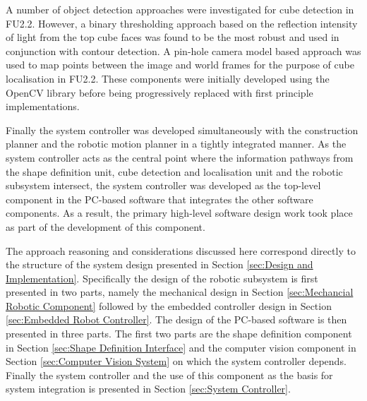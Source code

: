 A number of object detection approaches were investigated for cube detection in FU2.2. However, a binary thresholding approach based on the reflection intensity of light from the top cube faces was found to be the most robust and used in conjunction with contour detection. A pin-hole camera model based approach was used to map points between the image and world frames for the purpose of cube localisation in FU2.2. These components were initially developed using the OpenCV library before being progressively replaced with first principle implementations.

Finally the system controller was developed simultaneously with the construction planner and the robotic motion planner in a tightly integrated manner. As the system controller acts as the central point where the information pathways from the shape definition unit, cube detection and localisation unit and the robotic subsystem intersect, the system controller was developed as the top-level component in the PC-based software that integrates the other software components. As a result, the primary high-level software design work took place as part of the development of this component.

The approach reasoning and considerations discussed here correspond directly to the structure of the system design presented in Section \ref{sec:Design and Implementation}. Specifically the design of the robotic subsystem is first presented in two parts, namely the mechanical design in Section \ref{sec:Mechancial Robotic Component} followed by the embedded controller design in Section \ref{sec:Embedded Robot Controller}. The design of the PC-based software is then presented in three parts. The first two parts are the shape definition component in Section \ref{sec:Shape Definition Interface} and the computer vision component in Section \ref{sec:Computer Vision System} on which the system controller depends. Finally the system controller and the use of this component as the basis for system integration is presented in Section \ref{sec:System Controller}.


\newpage


